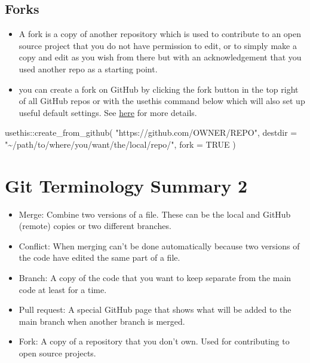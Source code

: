 \documentclass[
  letterpaper,
  DIV=11,
  numbers=noendperiod]{scrreprt}
\newenvironment{Shaded}{\begin{snugshade}}{\end{snugshade}}
\newcommand{\AttributeTok}[1]{\textcolor[rgb]{0.40,0.45,0.13}{#1}}
\newcommand{\ConstantTok}[1]{\textcolor[rgb]{0.56,0.35,0.01}{#1}}
\newcommand{\FunctionTok}[1]{\textcolor[rgb]{0.28,0.35,0.67}{#1}}
\newcommand{\NormalTok}[1]{\textcolor[rgb]{0.00,0.23,0.31}{#1}}
\newcommand{\SpecialCharTok}[1]{\textcolor[rgb]{0.37,0.37,0.37}{#1}}
\newcommand{\StringTok}[1]{\textcolor[rgb]{0.13,0.47,0.30}{#1}}
\providecommand{\tightlist}{%
  \setlength{\itemsep}{0pt}\setlength{\parskip}{0pt}}\usepackage{longtable,booktabs,array}
\begin{document}
\hypertarget{forks}{%
\subsection{Forks}\label{forks}}

\begin{itemize}
\item
  A fork is a copy of another repository which is used to contribute to
  an open source project that you do not have permission to edit, or to
  simply make a copy and edit as you wish from there but with an
  acknowledgement that you used another repo as a starting point.
\item
  you can create a fork on GitHub by clicking the fork button in the top
  right of all GitHub repos or with the usethis command below which will
  also set up useful default settings. See
  \href{https://happygitwithr.com/fork-and-clone.html\#fork-and-clone-create-from-github}{here}
  for more details.
\end{itemize}

\begin{Shaded}
\begin{Highlighting}[]
\NormalTok{usethis}\SpecialCharTok{::}\FunctionTok{create\_from\_github}\NormalTok{(}
  \StringTok{"https://github.com/OWNER/REPO"}\NormalTok{,}
  \AttributeTok{destdir =} \StringTok{"\textasciitilde{}/path/to/where/you/want/the/local/repo/"}\NormalTok{,}
  \AttributeTok{fork =} \ConstantTok{TRUE}
\NormalTok{)}
\end{Highlighting}
\end{Shaded}

\hypertarget{git-terminology-summary-2}{%
\section{Git Terminology Summary 2}\label{git-terminology-summary-2}}

\begin{itemize}
\tightlist
\item
  Merge: Combine two versions of a file. These can be the local and
  GitHub (remote) copies or two different branches.
\item
  Conflict: When merging can't be done automatically because two
  versions of the code have edited the same part of a file.
\item
  Branch: A copy of the code that you want to keep separate from the
  main code at least for a time.
\item
  Pull request: A special GitHub page that shows what will be added to
  the main branch when another branch is merged.
\item
  Fork: A copy of a repository that you don't own. Used for contributing
  to open source projects.
\end{itemize}
\end{document}
